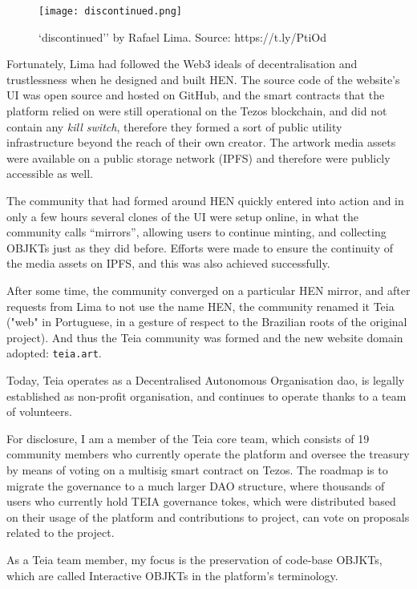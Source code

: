 \begin{figure}[h]
    \centering
    \texttt{[image: discontinued.png]}
    \caption[``discontinued'' by Rafael Lima]{`discontinued'' by Rafael Lima. Source: https://t.ly/PtiOd}
    \label{fig:discontinued}
\end{figure}

Fortunately, Lima had followed the Web3 ideals of decentralisation and trustlessness when he designed and built HEN. The source code of the website's UI was open source and hosted on GitHub, and the smart contracts that the platform relied on were still operational on the Tezos blockchain, and did not contain any \emph{kill switch}, therefore they formed a sort of public utility infrastructure beyond the reach of their own creator. The artwork media assets were available on a public storage network (IPFS) and therefore were publicly accessible as well.

The community that had formed around HEN quickly entered into action and in only a few hours several clones of the UI were setup online, in what the community calls ``mirrors'', allowing users to continue minting, and collecting OBJKTs just as they did before. Efforts were made to ensure the continuity of the media assets on IPFS, and this was also achieved successfully.

After some time, the community converged on a particular HEN mirror, and after requests from Lima to not use the name HEN, the community renamed it Teia ("web" in Portuguese, in a gesture of respect to the Brazilian roots of the original project). And thus the Teia community was formed and the new website domain adopted: \texttt{teia.art}.

Today, Teia operates as a Decentralised Autonomous Organisation \gls{dao}, is legally established as non-profit organisation, and continues to operate thanks to a team of volunteers.

For disclosure, I am a member of the Teia core team, which consists of 19 community members who currently operate the platform and oversee the treasury by means of voting on a multisig smart contract on Tezos. The roadmap is to migrate the governance to a much larger DAO structure, where thousands of users who currently hold TEIA governance tokes, which were distributed based on their usage of the platform and contributions to project, can vote on proposals related to the project.

As a Teia team member, my focus is the preservation of code-base OBJKTs, which are called Interactive OBJKTs in the platform's terminology.

